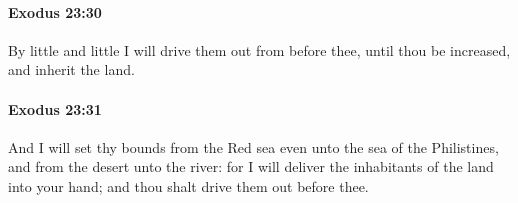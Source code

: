 		\paragraph{Exodus 23:30} %
			\label{EXODUS-23-30}

			By little and little I will drive them out from before thee, until thou be increased, and inherit the land.


		\paragraph{Exodus 23:31} %
			\label{EXODUS-23-31}

			And I will set thy bounds from the Red sea even unto the sea of the Philistines, and from the desert unto the river: for I will deliver the inhabitants of the land into your hand; and thou shalt drive them out before thee.



